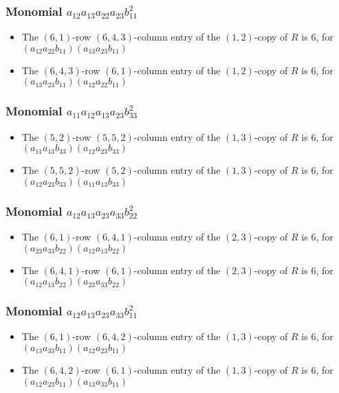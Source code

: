\documentclass{article}
\begin{document}
\subsubsection{Monomial $ a_{12} a_{13} a_{22} a_{23} b_{11}^{2} $}

\begin{itemize}
\item The $(6, 1)$-row $(6, 4, 3)$-column entry of the $ \left(1, 2\right) $-copy of $R$ is $ 6 $, for $( a_{12} a_{22} b_{11} )( a_{13} a_{23} b_{11} )$ 
\item The $(6, 4, 3)$-row $(6, 1)$-column entry of the $ \left(1, 2\right) $-copy of $R$ is $ 6 $, for $( a_{13} a_{23} b_{11} )( a_{12} a_{22} b_{11} )$ 
\end{itemize}
\subsubsection{Monomial $ a_{11} a_{12} a_{13} a_{23} b_{33}^{2} $}

\begin{itemize}
\item The $(5, 2)$-row $(5, 5, 2)$-column entry of the $ \left(1, 3\right) $-copy of $R$ is $ 6 $, for $( a_{11} a_{13} b_{33} )( a_{12} a_{23} b_{33} )$ 
\item The $(5, 5, 2)$-row $(5, 2)$-column entry of the $ \left(1, 3\right) $-copy of $R$ is $ 6 $, for $( a_{12} a_{23} b_{33} )( a_{11} a_{13} b_{33} )$ 
\end{itemize}
\subsubsection{Monomial $ a_{12} a_{13} a_{23} a_{33} b_{22}^{2} $}

\begin{itemize}
\item The $(6, 1)$-row $(6, 4, 1)$-column entry of the $ \left(2, 3\right) $-copy of $R$ is $ 6 $, for $( a_{23} a_{33} b_{22} )( a_{12} a_{13} b_{22} )$ 
\item The $(6, 4, 1)$-row $(6, 1)$-column entry of the $ \left(2, 3\right) $-copy of $R$ is $ 6 $, for $( a_{12} a_{13} b_{22} )( a_{23} a_{33} b_{22} )$ 
\end{itemize}
\subsubsection{Monomial $ a_{12} a_{13} a_{23} a_{33} b_{11}^{2} $}

\begin{itemize}
\item The $(6, 1)$-row $(6, 4, 2)$-column entry of the $ \left(1, 3\right) $-copy of $R$ is $ 6 $, for $( a_{13} a_{33} b_{11} )( a_{12} a_{23} b_{11} )$ 
\item The $(6, 4, 2)$-row $(6, 1)$-column entry of the $ \left(1, 3\right) $-copy of $R$ is $ 6 $, for $( a_{12} a_{23} b_{11} )( a_{13} a_{33} b_{11} )$ 
\end{itemize}
\end{document}
